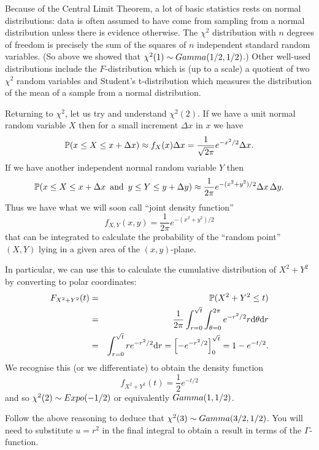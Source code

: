 Because of the Central Limit Theorem, a lot of basic statistics rests on normal distributions: data is often assumed to have come from sampling from a normal distribution unless there is evidence otherwise.  The $\chi^2$ distribution with $n$ degrees of freedom is precisely the sum of the squares of $n$ independent standard random variables. (So above we showed that $\chi^2(1) \sim {\mathop{Gamma}}(1/2,1/2)$.)   Other well-used distributions include the $F$-distribution which is (up to a scale) a quotient of two $\chi^2$ random variables and Student's t-distribution which measures the distribution of the mean of a sample from a normal distribution. 

Returning to $\chi^2$, let us try and understand $\chi^2(2)$.  If we have a unit normal random variable $X$ then for a small increment $\Delta x$ in $x$ we have
 \[
      {\mathbb P}( x \leq X \leq x+ \Delta x) \approx f_X(x) \Delta x = 
       \frac1{\sqrt{2 \pi}} e^{-x^2/2} \Delta x.
 \]
If we have another independent normal random variable $Y$ then 
 \[
    {\mathbb P}( x \leq X \leq x+ \Delta x \,\text{ and } \, 
     y \leq Y \leq y + \Delta y) \approx 
      \frac{1}{2 \pi} e^{-(x^2 + y^2)/2} \Delta x \, \Delta y.
 \]
Thus we have what we will soon call ``joint density function'' 
 \[
       f_{X,Y}(x,y)  = \frac1{2\pi}  e^{-(x^2+y^2)/2}
 \]
that can be integrated to calculate the probability of the ``random point'' $(X,Y)$ lying in a given area of the $(x,y)$-plane.

In particular, we can use this to calculate the cumulative distribution of $X^2+Y^2$ by converting to polar coordinates:
\begin{eqnarray*} 
     F_{X^2+Y^2}(t) &=&  {\mathbb P}( X^2+Y^2 \leq t) \\
       &=& \frac1{2\pi}  \int_{r=0}^{\sqrt{t}} \int_{\theta=0}^{2\pi} 
         e^{-r^2/2} r \mathrm{d} \theta \mathrm{d} r \\
      &=&  \int_{r=0}^{\sqrt{t}} 
        r  e^{-r^2/2}  \mathrm{d} r  = \left[ - e^{-r^2/2}   \right]^{\sqrt{t}}_0  = 1 - e^{-t/2}.
\end{eqnarray*} 
We recognise this (or we differentiate) to obtain the density function 
 \[
     f_{X^2+Y^2}(t) = \frac12 e^{-t/2}
 \]
and so  $\chi^2(2) \sim {\mathop{Expo}}(-1/2)$ or equivalently ${\mathop{Gamma}}(1, 1/2)$.

\bpr 
Follow the above reasoning to deduce that $\chi^2(3) \sim {\mathop{Gamma}}(3/2, 1/2)$. You will need to substitute $u=r^2$ in the final integral to obtain a result in terms of the $\Gamma$-function.   

